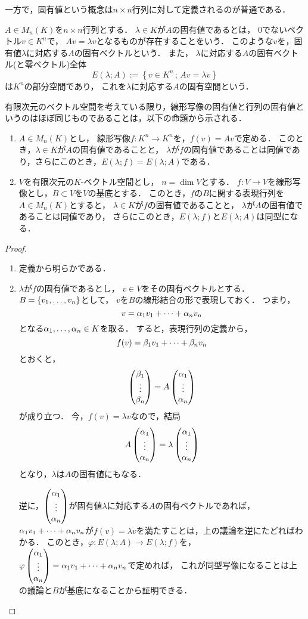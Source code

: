 一方で，固有値という概念は$n \times n$行列に対して定義されるのが普通である．
\begin{dfn}
    $A \in M_n(K)$を$n \times n$行列とする．
    $\lambda \in K$が$A$の固有値であるとは，
    0でないベクトル$v \in K^n$で，
    $Av = \lambda v$となるものが存在することをいう．
    このような$v$を，固有値$\lambda$に対応する$A$の固有ベクトルという．
    また，
    $\lambda$に対応する$A$の固有ベクトル(と零ベクトル)全体
    \[
        E(\lambda;A) := \left\{
            v \in K^n \,;\,
            Av = \lambda v
        \right\}
    \]
    は$K^n$の部分空間であり，
    これを$\lambda$に対応する$A$の固有空間という．
\end{dfn}
有限次元のベクトル空間を考えている限り，線形写像の固有値と行列の固有値というのはほぼ同じものであることは，以下の命題から示される．
\begin{prop}
    \begin{enumerate}
        \item $A \in M_n(K)$とし，
        線形写像$f \colon K^n \to K^n$を，$f(v) = Av$で定める．
        このとき，$\lambda \in K$が$A$の固有値であることと，
        $\lambda$が$f$の固有値であることは同値であり，さらにこのとき，$E(\lambda;f)=E(\lambda;A)$である．
        \item $V$を有限次元の$K$-ベクトル空間とし，
        $n = \dim V$とする．
        $f \colon V \to V$を線形写像とし，$B \subset V$を$V$の基底とする．
        このとき，$f$の$B$に関する表現行列を$A \in M_n(K)$とすると，
        $\lambda \in K$が$f$の固有値であることと，
        $\lambda$が$A$の固有値であることは同値であり，
        さらにこのとき，$E(\lambda;f)$と$E(\lambda;A)$は同型になる．
    \end{enumerate}
\end{prop}
\begin{proof}
    \begin{enumerate}
        \item 定義から明らかである．
        \item $\lambda$が$f$の固有値であるとし，
        $v \in V$をその固有ベクトルとする．
        $B = \{\idxdot{v}{1}{n}\}$として，
        $v$を$B$の線形結合の形で表現しておく．
        つまり，
        \[
            v = \lncmb{\alpha}{v}{1}{n}{+}
        \]
        となる$\idxdot{\alpha}{1}{n} \in K$を取る．
        すると，表現行列の定義から，
        \[
            f(v) = \lncmb{\beta}{v}{1}{n}{+}
        \]
        とおくと，
        \[
            \idxvec{\beta}{1}{n}
            = A \idxvec{\alpha}{1}{n}
        \]
        が成り立つ．
        今，$f(v) = \lambda v$なので，結局
        \[
            A \idxvec{\alpha}{1}{n} = \lambda \idxvec{\alpha}{1}{n}
        \]
        となり，$\lambda$は$A$の固有値にもなる．
        
        逆に，$\idxvec{\alpha}{1}{n}$が固有値$\lambda$に対応する$A$の固有ベクトルであれば，
        $\lncmb{\alpha}{v}{1}{n}{+}$が$f(v)=\lambda v$を満たすことは，上の議論を逆にたどればわかる．
        このとき，$\varphi \colon E(\lambda;A) \to E(\lambda; f)$を，
        $\varphi \idxvec{\alpha}{1}{n} = \lncmb{\alpha}{v}{1}{n}{+}$で定めれば，
        これが同型写像になることは上の議論と$B$が基底になることから証明できる．
    \end{enumerate}
\end{proof}
